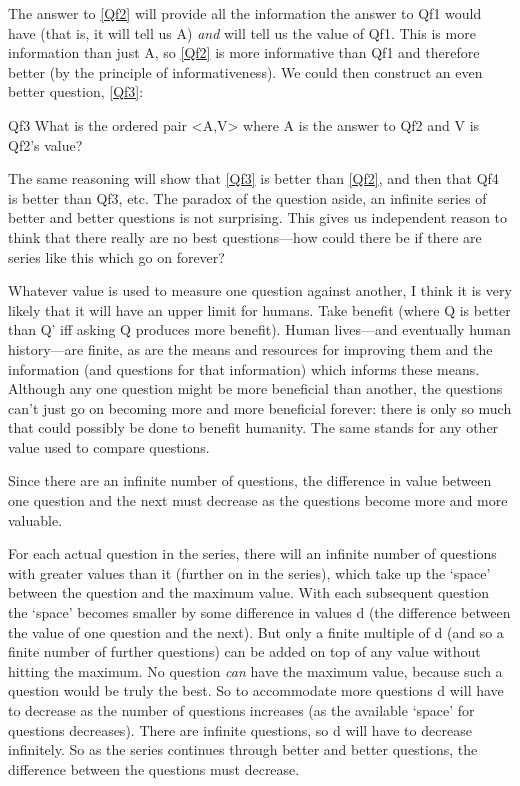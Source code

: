 The answer to \ref{Qf2} will provide all the information the answer to Qf1 would have (that is, it will tell us A) \emph{and} will tell us the value of Qf1.
This is more information than just A, so \ref{Qf2} is more informative than Qf1 and therefore better (by the principle of informativeness).
We could then construct an even better question, \ref{Qf3}:

	\begin{principle}{Qf3}\label{Qf3}
	What is the ordered pair <A,V> where A is the answer to Qf2 and V is Qf2's value?
	\end{principle}

The same reasoning will show that \ref{Qf3} is better than \ref{Qf2}, and then that Qf4 is better than Qf3, etc.
The paradox of the question aside, an infinite series of better and better questions is not surprising.
This gives us independent reason to think that there really are no best questions---how could there be if there are series like this which go on forever?

Whatever value is used to measure one question against another, I think it is very likely that it will have an upper limit for humans.
Take benefit (where Q is better than Q' iff asking Q produces more benefit).
Human lives---and eventually human history---are finite, as are the means and resources for improving them and the information (and questions for that information) which informs these means.
Although any one question might be more beneficial than another, the questions can't just go on becoming more and more beneficial forever: there is only so much that could possibly be done to benefit humanity.
The same stands for any other value used to compare questions.

Since there are an infinite number of questions, the difference in value between one question and the next must decrease as the questions become more and more valuable.

For each actual question in the series, there will an infinite number of questions with greater values than it (further on in the series), which take up the `space' between the question and the maximum value.
With each subsequent question the `space' becomes smaller by some difference in values d (the difference between the value of one question and the next).
But only a finite multiple of d (and so a finite number of further questions) can be added on top of any value without hitting the maximum.
No question \emph{can} have the maximum value, because such a question would be truly the best.
So to accommodate more questions d will have to decrease as the number of questions increases (as the available `space' for questions decreases).
There are infinite questions, so d will have to decrease infinitely.
So as the series continues through better and better questions, the difference between the questions must decrease.

